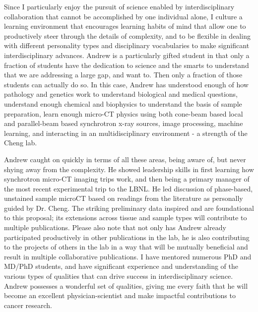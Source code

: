 \documentclass{NIHGrant}
\begin{document}
Since I particularly enjoy the pursuit of science enabled by interdisciplinary collaboration that cannot be accomplished by one individual alone, I culture a learning environment that encourages learning habits of mind that allow one to productively steer through the details of complexity, and to be flexible in dealing with different personality types and disciplinary vocabularies to make significant interdisciplinary advances. Andrew is a particularly gifted student in that only a fraction of students have the dedication to science and the smarts to understand that we are addressing a large gap, and want to. Then only a fraction of those students can actually do so. In this case, Andrew has understood enough of how pathology and genetics work to understand biological and medical questions, understand enough chemical and biophysics to understand the basis of sample preparation, learn enough micro-CT physics using both cone-beam based local and parallel-beam based synchrotron x-ray sources, image processing, machine learning, and interacting in an multidisciplinary environment - a strength of the Cheng lab. 

Andrew caught on quickly in terms of all these areas, being aware of, but never shying away from the complexity.  He showed leadership skills in first learning how synchrotron micro-CT imaging trips work, and then being a primary manager of the most recent experimental trip to the LBNL. He led discussion of phase-based, unstained sample microCT based on readings from the literature as personally guided by Dr. Cheng. The striking preliminary data inspired and are foundational to this proposal; its extensions across tissue and sample types will contribute to multiple publications. Please also note that not only has Andrew already participated productively in other publications in the lab, he is also contributing to the projects of others in the lab in a way that will be mutually beneficial and result in multiple collaborative publications. I have mentored numerous PhD and MD/PhD students, and have significant experience and understanding of the various types of qualities that can drive success in interdisciplinary science. Andrew possesses a wonderful set of qualities, giving me every faith that he will become an excellent physician-scientist and make impactful contributions to cancer research. 
\end{document}

